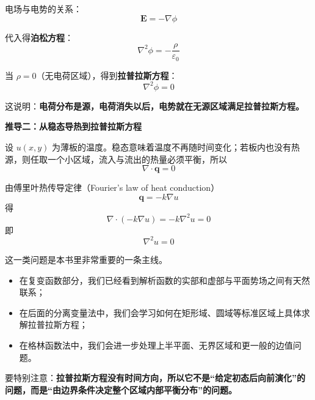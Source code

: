 电场与电势的关系：
\begin{equation}
    \boldsymbol{E} = -\nabla\phi
\end{equation}

代入得\textbf{泊松方程}：
\begin{equation}
    \boxed{\nabla^2\phi = -\frac{\rho}{\varepsilon_0}}
\end{equation}

当 $\rho = 0$（无电荷区域），得到\textbf{拉普拉斯方程}：
\begin{equation}
    \boxed{\nabla^2\phi = 0}
\end{equation}

这说明：\textbf{电荷分布是源，电荷消失以后，电势就在无源区域满足拉普拉斯方程。}

\textbf{推导二：从稳态导热到拉普拉斯方程}

设 $u(x, y)$ 为薄板的温度。稳态意味着温度不再随时间变化；若板内也没有热源，则任取一个小区域，流入与流出的热量必须平衡，所以
\begin{equation}
    \nabla \cdot \boldsymbol{q} = 0
\end{equation}

由傅里叶热传导定律（Fourier's law of heat conduction）
\begin{equation}
    \boldsymbol{q} = -k\nabla u
\end{equation}
得
\begin{equation}
    \nabla \cdot (-k\nabla u) = -k\nabla^2 u = 0
\end{equation}
即
\begin{equation}
    \boxed{\nabla^2 u = 0}
\end{equation}

\begin{tishi}[二维势场问题在后面各章中的角色]
这一类问题是本书里非常重要的一条主线。
\begin{itemize}
    \item 在复变函数部分，我们已经看到解析函数的实部和虚部与平面势场之间有天然联系；
    \item 在后面的分离变量法中，我们会学习如何在矩形域、圆域等标准区域上具体求解拉普拉斯方程；
    \item 在格林函数法中，我们会进一步处理上半平面、无界区域和更一般的边值问题。
\end{itemize}

要特别注意：\textbf{拉普拉斯方程没有时间方向，所以它不是``给定初态后向前演化''的问题，而是``由边界条件决定整个区域内部平衡分布''的问题。}
\end{tishi}


